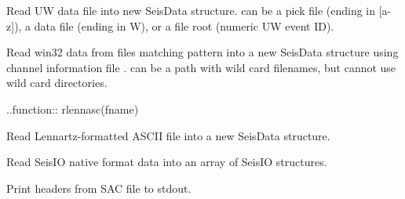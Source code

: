 \documentclass[letterpaper,11pt,english]{sphinxmanual}
\begin{document}
\begin{fulllineitems}
\label{\detokenize{src/Formats/fileformats:readuw}}
\end{fulllineitems}


Read UW data file into new SeisData structure.  can be a pick file (ending in {[}a-z{]}), a data file (ending in W), or a file root (numeric UW event ID).

\begin{fulllineitems}
\label{\detokenize{src/Formats/fileformats:readwin32}}
\end{fulllineitems}


Read win32 data from files matching pattern  into a new SeisData structure using channel information file .  can be a path with wild card filenames, but cannot use wild card directories.

..function:: rlennasc(fname)

Read Lennartz-formatted ASCII file into a new SeisData structure.

\begin{fulllineitems}
\label{\detokenize{src/Formats/fileformats:rseis}}
\end{fulllineitems}


Read SeisIO native format data into an array of SeisIO structures.

\begin{fulllineitems}
\label{\detokenize{src/Formats/fileformats:sachdr}}
\end{fulllineitems}


Print headers from SAC file to stdout.

\begin{fulllineitems}
\label{\detokenize{src/Formats/fileformats:segyhdr}}
\end{fulllineitems}
\end{document}

